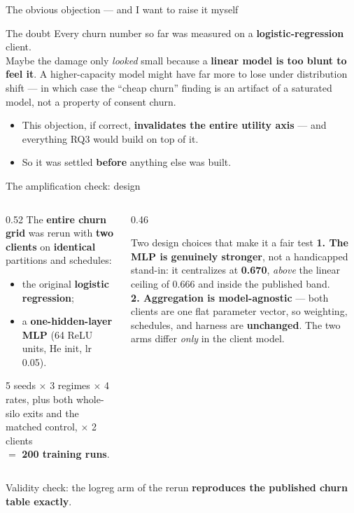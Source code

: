 \documentclass[aspectratio=169, 11pt]{beamer}
\begin{document}
\begin{frame}{The obvious objection --- and I want to raise it myself}
\begin{alertblock}{The doubt}
Every churn number so far was measured on a \textbf{logistic-regression}
client.\\[0.5em]
Maybe the damage only \emph{looked} small because a \textbf{linear model is
too blunt to feel it}. A higher-capacity model might have far more to lose
under distribution shift --- in which case the ``cheap churn'' finding is an
artifact of a saturated model, not a property of consent churn.
\end{alertblock}
\vspace{0.6em}
\begin{itemize}
\item This objection, if correct, \textbf{invalidates the entire utility
      axis} --- and everything RQ3 would build on top of it.
\item So it was settled \textbf{before} anything else was built.
\end{itemize}
\end{frame}

\begin{frame}{The amplification check: design}
\begin{columns}[T]
\begin{column}{0.52\textwidth}
The \textbf{entire churn grid} was rerun with \textbf{two clients} on
\textbf{identical} partitions and schedules:
\begin{itemize}\small
\item the original \textbf{logistic regression};
\item a \textbf{one-hidden-layer MLP} (64 ReLU units, He init, lr 0.05).
\end{itemize}
\vspace{0.4em}
5 seeds $\times$ 3 regimes $\times$ 4 rates, plus both whole-silo exits and
the matched control, $\times$ 2 clients\\
$=$ \textbf{200 training runs}.
\end{column}
\begin{column}{0.46\textwidth}
\begin{exampleblock}{Two design choices that make it a fair test}
\textbf{1. The MLP is genuinely stronger}, not a handicapped stand-in: it
centralizes at \textbf{0.670}, \emph{above} the linear ceiling of 0.666 and
inside the published band.\\[0.5em]
\textbf{2. Aggregation is model-agnostic} --- both clients are one flat
parameter vector, so weighting, schedules, and harness are
\textbf{unchanged}. The two arms differ \emph{only} in the client model.
\end{exampleblock}
\end{column}
\end{columns}
\vspace{0.2em}
{\scriptsize Validity check: the logreg arm of the rerun \textbf{reproduces
the published churn table exactly}.}
\end{frame}
\end{document}
